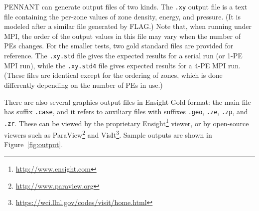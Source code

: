\documentclass[11pt,letterpaper]{article}
\begin{document}
PENNANT can generate output files of two kinds.  The {\tt.xy} output file
is a text file containing the per-zone values of zone density, energy,
and pressure.  (It is modeled after a similar file generated by FLAG.)
Note that, when running under MPI, the order of the output values in
this file may vary when the number of PEs changes.
For the smaller tests, two gold standard files are provided for reference.
The {\tt.xy.std} file gives the expected results for a serial run (or
1-PE MPI run), while the {\tt.xy.std4} file gives expected results for
a 4-PE MPI run.  (These files are identical except for the ordering of
zones, which is done differently depending on the number of PEs in use.)

There are also several graphics output files in Ensight Gold format:
the main file has suffix {\tt.case}, and it refers to auxiliary files
with suffixes {\tt.geo}, {\tt.ze}, {\tt.zp}, and {\tt.zr}.  These
can be viewed by the proprietary
Ensight\footnote{\url{http://www.ensight.com}}
viewer, or by open-source viewers such as
ParaView\footnote{\url{http://www.paraview.org}} and
VisIt\footnote{\url{https://wci.llnl.gov/codes/visit/home.html}}.
Sample outputs are shown in Figure~\ref{fig:output}.
\end{document}
